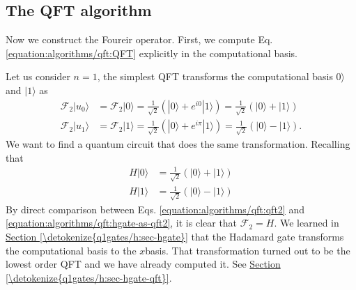 \documentclass[letterpaper,10pt,english]{jupyterBook}
\begin{document}
\subsection{The QFT algorithm}
\label{\detokenize{algorithms/qft:the-qft-algorithm}}
\sphinxAtStartPar
Now we construct the Foureir operator.
First, we compute Eq. \eqref{equation:algorithms/qft:QFT} explicitly in the computational basis.

\sphinxAtStartPar
{}Let us consider \(n=1\), the simplest QFT transforms the computational basis \(0\rangle\) and \(|1\rangle\) as
\begin{align}
\mathcal{F}_2 |u_0\rangle &= \mathcal{F}_2 |0\rangle = \frac{1}{\sqrt{2}} \left(|0\rangle +  e^{i 0} |1\rangle\right) = \frac{1}{\sqrt{2}} \left(|0\rangle + |1\rangle\right)\\
\mathcal{F}_2 |u_1\rangle &= \mathcal{F}_2 |1\rangle = \frac{1}{\sqrt{2}} \left(|0\rangle + e^{i \pi}|1\rangle\right) = \frac{1}{\sqrt{2}} \left(|0\rangle - |1\rangle\right).\label{equation:algorithms/qft:qft2}
\end{align}
\sphinxAtStartPar
We want to find a quantum circuit that does the same transformation. Recalling that
\begin{align}
H |0\rangle &= \frac{1}{\sqrt{2}} \left(|0\rangle + |1\rangle\right) \\
H |1\rangle &= \frac{1}{\sqrt{2}} \left(|0\rangle - |1\rangle\right) \label{equation:algorithms/qft:hgate-as-qft2}
\end{align}
\sphinxAtStartPar
By direct comparison between Eqs. \eqref{equation:algorithms/qft:qft2} and \eqref{equation:algorithms/qft:hgate-as-qft2}, it is clear that \(\mathcal{F}_2 = H\). We learned in \hyperref[\detokenize{q1gates/h:sec-hgate}]{Section \ref{\detokenize{q1gates/h:sec-hgate}}} that the Hadamard gate transforms the computational basis to the \(x\)\sphinxhyphen{}basis. That transformation turned out to be the lowest order QFT and  we have already computed it.   See \hyperref[\detokenize{q1gates/h:sec-hgate-qft}]{Section \ref{\detokenize{q1gates/h:sec-hgate-qft}}}.
\end{document}
